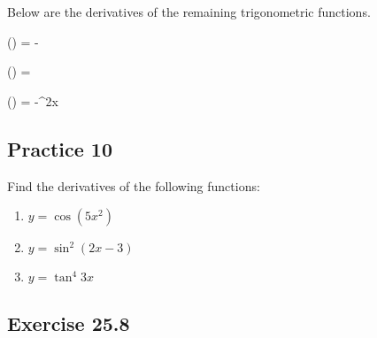 \documentclass[12pt]{report}
\begin{document}
Below are the derivatives of the remaining trigonometric functions.

\begin{mdframed}[style=MyFrame]
    \begin{cequation}
         () = - 
    \end{cequation}
    \begin{cequation}
         () =  
    \end{cequation}
    \begin{cequation}
         () = -\csc^{2}{x}
    \end{cequation}
\end{mdframed}

\subsection{Practice 10}

Find the derivatives of the following functions:
\setlength{\columnseprule}{1pt} \setlength{\columnsep}{24pt}
\begin{multicols}{2}
    \begin{enumerate}
        \item $y=\cos\left(5x^{2}\right)$
        \item $y=\sin^{2}(2x-3)$
        \item $y=\tan^{4}3x$
    \end{enumerate}
\end{multicols}

\subsection{Exercise 25.8}
\end{document}
